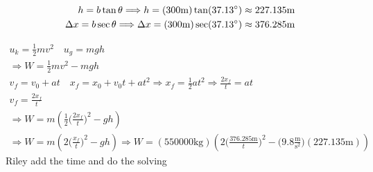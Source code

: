 \documentclass{article}
\begin{document}
\begin{align*}
    h=b\tan\theta 
    \Longrightarrow h=(300\text{m})\tan(37.13\degree) \approx 227.135\text{m}
    \\
    \Delta x=b\sec\theta
    \Longrightarrow \Delta x=(300\text{m})\sec(37.13\degree) \approx 376.285\text{m}
\end{align*}

\begin{align*}
    u_k=\frac{1}{2}mv^2 \quad u_g=mgh \\
    \Longrightarrow W=\frac{1}{2}mv^2-mgh \\
    v_f=v_0+at 
    \quad x_f=x_0+v_0t+at^2 \Longrightarrow x_f=\frac{1}{2}at^2 \Longrightarrow \frac{2x_f}{t}=at \\
    v_f=\frac{2x_f}{t} \\
    \Longrightarrow W=m(\frac{1}{2}\biggr(\frac{2x_f}{t}\biggr)^2-gh) \\
    \Longrightarrow W=m(2\biggr(\frac{x_f}{t}\biggr)^2-gh)
    \Longrightarrow W=(550000\text{kg})(2\biggr(\frac{376.285\text{m}}{t}\biggr)^2-\biggr(9.8\frac{\text{m}}{\text{s}^2}\biggr)(227.135\text{m}))
\end{align*}
Riley add the time and do the solving
\end{document}
